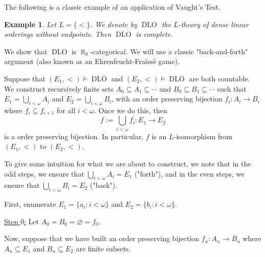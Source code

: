 \documentclass[10pt]{article}
\makeatletter
\DeclareMathOperator{\DLO}{DLO}
\theoremstyle{newstyle}
\newtheorem{exmp}[thm]{Example}
\newenvironment{pf}[1][\proofname]{\par
  \pushQED{\qed}%
  \normalfont \topsep0\p@\relax
  \trivlist
  \item[\hskip\labelsep\scshape
  #1\@addpunct{.}]\ignorespaces
}{%
  \popQED\endtrivlist\@endpefalse
}
\makeatother
\begin{document}
The following is a classic example of an application of Vaught's Test. 

\begin{exmp}
Let $L = \{<\}$. We denote by $\DLO$ the $L$-theory of dense linear orderings without endpoints. 
Then $\DLO$ is complete.
\end{exmp}
\begin{pf}
We show that $\DLO$ is $\aleph_0$-categorical. We will use 
a classic "back-and-forth" argument (also known as an Ehrenfeucht-Fra\"iss\'e game). 

Suppose that $(E_1, <) \vDash \DLO$ and $(E_2, <) \vDash \DLO$ are both countable. 
We construct recursively finite sets $A_0 \subseteq A_1 \subseteq \cdots$ and 
$B_0 \subseteq B_1 \subseteq \cdots$ such that $E_1 = \bigcup_{i<\omega} A_i$ 
and $E_2 = \bigcup_{i<\omega} B_i$, with an order preserving bijection 
$f_i : A_i \to B_i$ where $f_i \subseteq f_{i+1}$ for all $i < \omega$. 
Once we do this, then 
\[ f := \bigcup_{i < \omega} f_i : E_1 \to E_2 \]
is a order preserving bijection. In particular, $f$ is an $L$-isomorphism from 
$(E_1, <)$ to $(E_2, <)$. 

To give some intuition for what we are about to construct, we note that in the odd steps, 
we ensure that $\bigcup_{i<\omega} A_i = E_1$ ("forth"), and in the even steps, we 
ensure that $\bigcup_{i<\omega} B_i = E_2$ ("back"). 

First, enumerate $E_1 = \{a_i : i < \omega\}$ and $E_2 = \{b_i : i < \omega\}$. 

\underline{Step $0$:} Let $A_0 = B_0 = \varnothing = f_0$. 

Now, suppose that we have built an order preserving bijection $f_n : A_n \to B_n$ where 
$A_n \subseteq E_1$ and $B_n \subseteq E_2$ are finite subsets. 


\end{pf}
\end{document}
